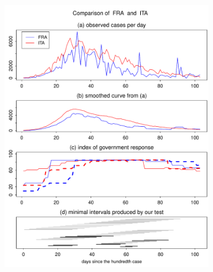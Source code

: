 \documentclass[a4paper,12pt]{article}
\numberwithin{equation}{section}
\begin{document}
\begin{figure}[t!]\ContinuedFloat
\begin{subfigure}[b]{0.475\textwidth}
\includegraphics[width=\textwidth]{plots/FRA_vs_ITA}
\end{subfigure}\hspace{0.55cm}
\begin{subfigure}[b]{0.475\textwidth}

\end{subfigure}
\end{figure}
\end{document}
